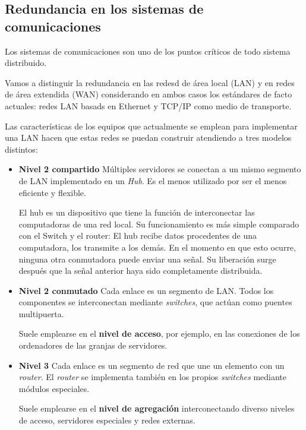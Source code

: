 \subsection{Redundancia en los sistemas de comunicaciones}
Los sistemas de comunicaciones son uno de los puntos críticos de todo sistema distribuido.

Vamos a distinguir la redundancia en las redesd de área local (LAN) y en redes de área extendida (WAN) considerando en ambos casos los estándares de facto actuales: redes LAN basads en Ethernet y TCP/IP como medio de transporte.

Las características de los equipos que actualmente se emplean para implementar una LAN hacen que estas redes se puedan construir atendiendo a tres modelos distintos:
\begin{itemize}
\item \textbf{Nivel 2 compartido} Múltiples servidores se conectan a un mismo segmento de LAN implementado en un \textit{Hub}. Es el menos utilizado por ser el menos eficiente y flexible.

El hub es un dispositivo que tiene la función de interconectar las computadoras de una red local. Su funcionamiento es más simple comparado con el Switch y el router:
El hub recibe datos procedentes de una computadora, los transmite a los demás. En el momento en que esto ocurre, ninguna otra conmutadora puede enviar una señal. Su liberación surge después que la señal anterior haya sido completamente distribuida.


\item \textbf{Nivel 2 conmutado} Cada enlace es un segmento de LAN. Todos los componentes se interconectan mediante \textit{switches}, que actúan como puentes multipuerta.

Suele emplearse en el \textbf{nivel de acceso}, por ejemplo, en las conexiones de los ordenadores de las granjas de servidores.

\item \textbf{Nivel 3} Cada enlace es un segmento de red que une un elemento con un \textit{router}. El \textit{router} se implementa también en los propios \textit{switches} mediante módulos especiales.

Suele emplearse en el \textbf{nivel de agregación} interconectando diverso niveles de acceso, servidores especiales y redes externas.
\end{itemize}

